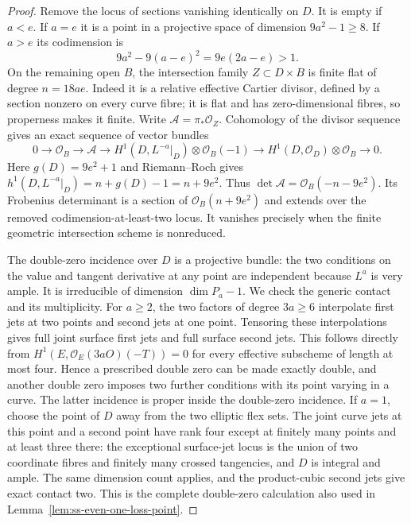 \begin{proof}
Remove the locus of sections vanishing identically on $D$.
It is empty if $a<e$. If $a=e$ it is a point in a projective
space of dimension $9a^2-1\ge8$. If $a>e$ its codimension is
\[
                  9a^2-9(a-e)^2=9e(2a-e)>1.
\]
On the remaining open $B$, the intersection family
$Z\subset D\times B$ is finite flat of degree $n=18ae$.
Indeed it is a relative effective Cartier divisor, defined by a
section nonzero on every curve fibre; it is flat and has
zero-dimensional fibres, so properness makes it finite.
Write $\mathcal A=\pi_*\mathcal O_Z$. Cohomology of the divisor
sequence gives an exact sequence of vector bundles
\[
 0\to\mathcal O_B\to\mathcal A\to
 H^1(D,L^{-a}|_D)\otimes\mathcal O_B(-1)
       \to H^1(D,\mathcal O_D)\otimes\mathcal O_B\to0.
\]
Here $g(D)=9e^2+1$ and Riemann--Roch gives
$h^1(D,L^{-a}|_D)=n+g(D)-1=n+9e^2$.
Thus $\det\mathcal A=\mathcal O_B(-n-9e^2)$.
Its Frobenius determinant is a section of
$\mathcal O_B(n+9e^2)$ and extends over the removed
codimension-at-least-two locus. It vanishes precisely when the
finite geometric intersection scheme is nonreduced.

The double-zero incidence over $D$ is a projective bundle:
the two conditions on the value and tangent derivative at any
point are independent because $L^a$ is very ample.
It is irreducible of dimension $\dim P_a-1$.
We check the generic contact and its multiplicity.
For $a\ge2$, the two factors of degree $3a\ge6$ interpolate
first jets at two points and second jets at one point. Tensoring
these interpolations gives full joint surface first jets and
full surface second jets. This follows directly from
$H^1(E,\mathcal O_E(3aO)(-T))=0$ for every effective
subscheme of length at most four. Hence a prescribed double
zero can be made exactly double, and another double zero
imposes two further conditions with its point varying in a
curve. The latter incidence is proper inside the double-zero
incidence. If $a=1$, choose the point of $D$ away from the two
elliptic flex sets. The joint curve jets at this point and a
second point have rank four except at finitely many points and
at least three there: the exceptional surface-jet locus is the
union of two coordinate fibres and finitely many crossed
tangencies, and $D$ is integral and ample. The same dimension
count applies, and the product-cubic second jets give exact
contact two. This is the complete double-zero calculation also
used in Lemma~\ref{lem:ss-even-one-loss-point}.


\end{proof}
